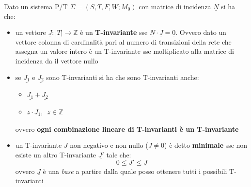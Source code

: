 \documentclass[a4paper,12pt, oneside]{book}
\begin{document}
\begin{definizione}
  Dato un sistema P/T $\Sigma=(S,T,F,W;M_0)$ con matrice di incidenza
  $\underline{N}$ si ha che:
  \begin{itemize}
    \item un vettore $\underline{J}:|T|\to\mathbb{Z}$ è un \textbf{T-invariante}
    sse $\underline{N}\cdot\underline{J}=\underline{0}$. Ovvero dato un vettore
    colonna di cardinalità pari al numero di transizioni della rete che assegna
    un valore intero è un T-invariante sse moltiplicato alla matrice di
    incidenza da il vettore nullo
    \item se $\underline{J_1}$ e $\underline{J_2}$ sono T-invarianti si ha che
    sono T-invarianti anche: 
    \begin{itemize}
      \item $\underline{J_1}+\underline{J_2}$
      \item $z\cdot\underline{J_1},\,\,\,z\in \mathbb{Z}$
    \end{itemize}
    ovvero \textbf{ogni combinazione lineare di T-invarianti è un T-invariante}
    \item un T-invariante $\underline{J}$ non negativo e non nullo
    ($\underline{J}\neq 0$) è detto \textbf{minimale} sse non esiste un altro
    T-invariante $\underline{J'}$ tale che:
    \[0\leq \underline{J'}\leq \underline{J}\]
    ovvero $\underline{J}$ è una \emph{base} a partire dalla quale posso
    ottenere tutti i possibili T-invarianti
  \end{itemize}
\end{definizione}
\end{document}
